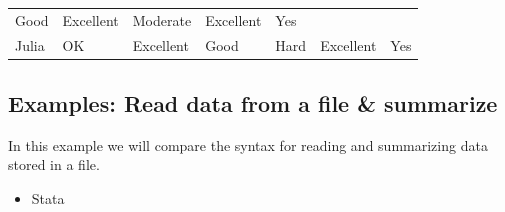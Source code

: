 \documentclass[
]{book}
\providecommand{\tightlist}{%
  \setlength{\itemsep}{0pt}\setlength{\parskip}{0pt}}
\begin{document}
\begin{longtable}[]{@{}lllllll@{}}
\begin{minipage}[t]{0.13\columnwidth}
Good\strut
\end{minipage} & \begin{minipage}[t]{0.16\columnwidth}\raggedright
Excellent\strut
\end{minipage} & \begin{minipage}[t]{0.11\columnwidth}\raggedright
Moderate\strut
\end{minipage} & \begin{minipage}[t]{0.17\columnwidth}\raggedright
Excellent\strut
\end{minipage} & \begin{minipage}[t]{0.05\columnwidth}\raggedright
Yes\strut
\end{minipage}\tabularnewline
\begin{minipage}[t]{0.08\columnwidth}\raggedright
Julia\strut
\end{minipage} & \begin{minipage}[t]{0.10\columnwidth}\raggedright
OK\strut
\end{minipage} & \begin{minipage}[t]{0.13\columnwidth}\raggedright
Excellent\strut
\end{minipage} & \begin{minipage}[t]{0.16\columnwidth}\raggedright
Good\strut
\end{minipage} & \begin{minipage}[t]{0.11\columnwidth}\raggedright
Hard\strut
\end{minipage} & \begin{minipage}[t]{0.17\columnwidth}\raggedright
Excellent\strut
\end{minipage} & \begin{minipage}[t]{0.05\columnwidth}\raggedright
Yes\strut
\end{minipage}\tabularnewline
\bottomrule
\end{longtable}

\hypertarget{examples-read-data-from-a-file-summarize}{%
\subsection{Examples: Read data from a file \& summarize}\label{examples-read-data-from-a-file-summarize}}

In this example we will compare the syntax for reading and summarizing data stored in a file.

\begin{itemize}
\tightlist
\item
  Stata
\end{itemize}
\end{document}
